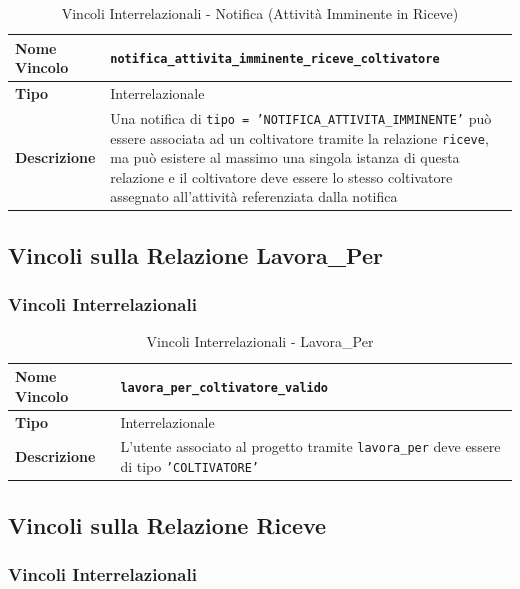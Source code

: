 \documentclass[12pt,a4paper]{article}
\begin{document}
\begin{table}[H]
\centering
\caption{Vincoli Interrelazionali - Notifica (Attività Imminente in Riceve)}
\begin{tabularx}{\textwidth}{|l|X|}
\hline
\textbf{Nome Vincolo} & \texttt{notifica\_attivita\_imminente\_riceve\_coltivatore} \\
\hline
\textbf{Tipo} & Interrelazionale \\
\hline
\textbf{Descrizione} & Una notifica di \texttt{tipo = 'NOTIFICA\_ATTIVITA\_IMMINENTE'} può essere associata ad un coltivatore tramite la relazione \texttt{riceve}, ma può esistere al massimo una singola istanza di questa relazione e il coltivatore deve essere lo stesso coltivatore assegnato all'attività referenziata dalla notifica \\
\hline
\end{tabularx}
\end{table}

\subsection{Vincoli sulla Relazione Lavora\_Per}

\subsubsection{Vincoli Interrelazionali}

\begin{table}[H]
\centering
\caption{Vincoli Interrelazionali - Lavora\_Per}
\begin{tabularx}{\textwidth}{|l|X|}
\hline
\textbf{Nome Vincolo} & \texttt{lavora\_per\_coltivatore\_valido} \\
\hline
\textbf{Tipo} & Interrelazionale \\
\hline
\textbf{Descrizione} & L'utente associato al progetto tramite \texttt{lavora\_per} deve essere di tipo \texttt{'COLTIVATORE'} \\
\hline
\end{tabularx}
\end{table}

\subsection{Vincoli sulla Relazione Riceve}

\subsubsection{Vincoli Interrelazionali}
\end{document}
